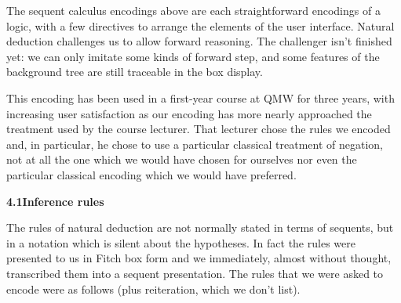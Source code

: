 \documentclass[11pt]{book}
\newcommand{\tab}{\hspace{5mm}}
\begin{document}
The sequent calculus encodings above are each straightforward encodings of a logic, with a few directives to arrange the elements of the user interface. Natural deduction challenges us to allow forward reasoning. The challenger isn't finished yet: we can only imitate some kinds of forward step, and some features of the background tree are still traceable in the box display.


This encoding has been used in a first-year course at QMW for three years, with increasing user satisfaction as our encoding has more nearly approached the treatment used by the course lecturer. That lecturer chose the rules we encoded and, in particular, he chose to use a particular classical treatment of negation, not at all the one which we would have chosen for ourselves nor even the particular classical encoding which we would have preferred.


\textbf{{\large 4.1\tab Inference rules}}


The rules of natural deduction are not normally stated in terms of sequents, but in a notation which is silent about the hypotheses. In fact the rules were presented to us in Fitch box form and we immediately, almost without thought, transcribed them into a sequent presentation. The rules that we were asked to encode were as follows (plus reiteration, which we don't list).\\
\end{document}
